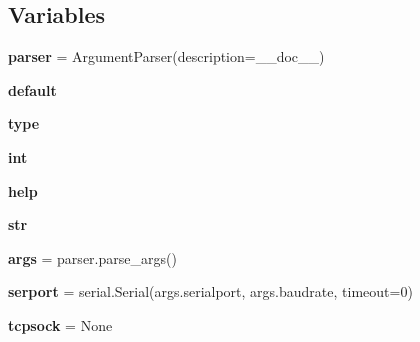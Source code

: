 \subsection*{Variables}
\begin{DoxyCompactItemize}
\item 
\mbox{\label{namespacepymavlink_1_1tools_1_1sertotcp_aa3dd094c6098a72b58a58bcedfee06ba}} 
{\bfseries parser} = Argument\+Parser(description=\+\_\+\+\_\+doc\+\_\+\+\_\+)
\item 
\mbox{\label{namespacepymavlink_1_1tools_1_1sertotcp_a5155d3e9f5af677146f4631236d6db70}} 
{\bfseries default}
\item 
\mbox{\label{namespacepymavlink_1_1tools_1_1sertotcp_a3e5a0995f5e8308207e66eb4b62913a2}} 
{\bfseries type}
\item 
\mbox{\label{namespacepymavlink_1_1tools_1_1sertotcp_acc958c5fc9b5c4b8795b1b610ea3fdd4}} 
{\bfseries int}
\item 
\mbox{\label{namespacepymavlink_1_1tools_1_1sertotcp_a4910fcac8e670df1cda872ceae80866a}} 
{\bfseries help}
\item 
\mbox{\label{namespacepymavlink_1_1tools_1_1sertotcp_a36c01b1b7be097afcc65c2b1a0aaacbf}} 
{\bfseries str}
\item 
\mbox{\label{namespacepymavlink_1_1tools_1_1sertotcp_ab233978b338bba7bac90e2e0ec6e4426}} 
{\bfseries args} = parser.\+parse\+\_\+args()
\item 
\mbox{\label{namespacepymavlink_1_1tools_1_1sertotcp_ad5c3bf7886d1b09611a8fa7439774576}} 
{\bfseries serport} = serial.\+Serial(args.\+serialport, args.\+baudrate, timeout=0)
\item 
\mbox{\label{namespacepymavlink_1_1tools_1_1sertotcp_ab50c30caa18849d8693fd3e379765605}} 
{\bfseries tcpsock} = None
\item 

\end{DoxyCompactItemize}
